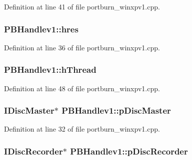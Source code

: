 Definition at line 41 of file portburn\+\_\+winxpv1.\+cpp.

\subsubsection[{\texorpdfstring{hres}{hres}}]{ P\+B\+Handlev1\+::hres}\hypertarget{struct_p_b_handlev1_ae58a4f41ed8e5c60d4d51c03038b24eb}{}\label{struct_p_b_handlev1_ae58a4f41ed8e5c60d4d51c03038b24eb}


Definition at line 36 of file portburn\+\_\+winxpv1.\+cpp.

\subsubsection[{\texorpdfstring{h\+Thread}{hThread}}]{ P\+B\+Handlev1\+::h\+Thread}\hypertarget{struct_p_b_handlev1_a7cfdfb5fda4a3b11944a895bc1798e73}{}\label{struct_p_b_handlev1_a7cfdfb5fda4a3b11944a895bc1798e73}


Definition at line 48 of file portburn\+\_\+winxpv1.\+cpp.

\subsubsection[{\texorpdfstring{p\+Disc\+Master}{pDiscMaster}}]{\setlength{\rightskip}{0pt plus 5cm}I\+Disc\+Master$\ast$ P\+B\+Handlev1\+::p\+Disc\+Master}\hypertarget{struct_p_b_handlev1_abc42c6380b3db318319ef6ecc2e3e3e3}{}\label{struct_p_b_handlev1_abc42c6380b3db318319ef6ecc2e3e3e3}


Definition at line 32 of file portburn\+\_\+winxpv1.\+cpp.

\subsubsection[{\texorpdfstring{p\+Disc\+Recorder}{pDiscRecorder}}]{\setlength{\rightskip}{0pt plus 5cm}I\+Disc\+Recorder$\ast$ P\+B\+Handlev1\+::p\+Disc\+Recorder}\hypertarget{struct_p_b_handlev1_aacaa84251424c2330ae867bd3df58a64}{}\label{struct_p_b_handlev1_aacaa84251424c2330ae867bd3df58a64}


